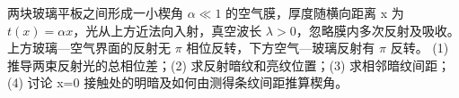 两块玻璃平板之间形成一小楔角 \(\alpha\ll1\) 的空气膜，厚度随横向距离 x 为 \(t(x)=\alpha x\)，光从上方近法向入射，真空波长 \(\lambda >0\)，忽略膜内多次反射及吸收。上方玻璃—空气界面的反射无 \(\pi \) 相位反转，下方空气—玻璃反射有 \(\pi \) 反转。
(1) 推导两束反射光的总相位差；(2) 求反射暗纹和亮纹位置；(3) 求相邻暗纹间距；(4) 讨论 x=0 接触处的明暗及如何由测得条纹间距推算楔角。

